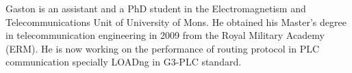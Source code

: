 Gaston is an assistant and a PhD student in the
Electromagnetism and Telecommunications Unit of University
of Mons. He obtained his Master’s degree in
telecommunication engineering in 2009 from the Royal
Military Academy (ERM). He is now working on the performance
of routing protocol in PLC communication specially LOADng in
G3-PLC standard.
